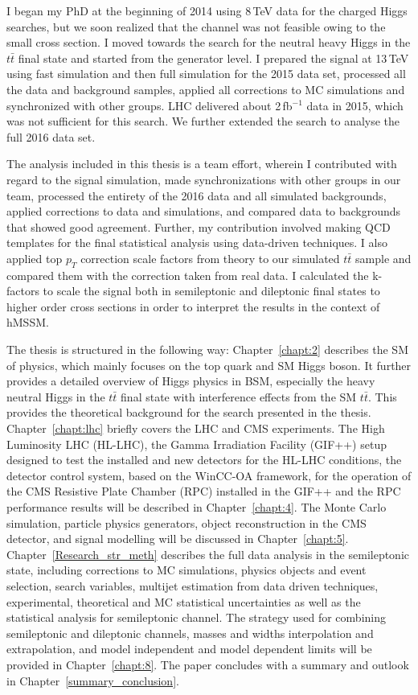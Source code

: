 I began my PhD at the beginning of 2014 using 8\,TeV data for the charged Higgs searches, but we soon realized that the channel was not feasible owing to the small cross section. I moved towards the search for the neutral heavy Higgs in the $t\bar t$ final state and started from the generator level. I prepared the signal at 13\,TeV using fast simulation and then full simulation for the 2015 data set, processed all the data and background samples, applied all corrections to MC simulations and synchronized with other groups. LHC delivered about 2\,fb$^{-1}$ data in 2015, which was not sufficient for this search. We further extended the search to analyse the full 2016 data set. 

The analysis included in this thesis is a team effort, wherein I contributed with regard to the signal simulation, made synchronizations with other groups in our team, processed the entirety of the 2016 data and all simulated backgrounds, applied corrections to data and simulations, and compared data to backgrounds that showed good agreement. Further, my contribution involved making QCD templates for the final statistical analysis using data-driven techniques. I also applied top $p_{T}$ correction scale factors from theory to our simulated $t\bar t$ sample and compared them with the correction taken from real data. I calculated the k-factors to scale the signal both in semileptonic and dileptonic final states to higher order cross sections in order to interpret the results in the context of hMSSM.

The thesis is structured in the following way:
Chapter~\ref{chapt:2} describes the SM of physics, which mainly focuses on the top quark and SM Higgs boson. It further provides a detailed overview of Higgs physics in BSM, especially the heavy neutral Higgs in the $t\bar t$ final state with interference effects from the SM $t\bar t$. This provides the theoretical background for the search presented in the thesis. Chapter~\ref{chapt:lhc} briefly covers the LHC and CMS experiments. The High Luminosity LHC (HL-LHC), the Gamma Irradiation Facility (GIF++) setup designed to test the installed and new detectors for the HL-LHC conditions, the detector control system, based on the WinCC-OA framework, for the operation of the CMS Resistive Plate Chamber (RPC) installed in the GIF++ and the RPC performance results will be described in Chapter~\ref{chapt:4}. The Monte Carlo simulation, particle physics generators, object reconstruction in the CMS detector, and signal modelling will be discussed in Chapter~\ref{chapt:5}. Chapter~\ref{Research_str_meth} describes the full data analysis in the semileptonic state, including corrections to MC simulations, physics objects and event selection, search variables, multijet estimation from data driven techniques, experimental, theoretical and MC statistical uncertainties as well as the statistical analysis for semileptonic channel. The strategy used for combining semileptonic and dileptonic channels, masses and widths interpolation and extrapolation, and model independent and model dependent limits will be provided in Chapter~\ref{chapt:8}. The paper concludes with a summary and outlook in Chapter~\ref{summary_conclusion}.   

